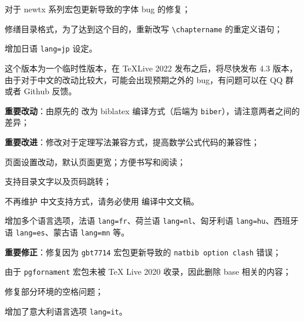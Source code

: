 \documentclass[lang=cn,newtx,10pt,scheme=chinese,pad,twocol]{zznote}
\begin{document}

\begin{change}
	\item 对于 newtx 系列宏包更新导致的字体 bug 的修复；
	\item 修缮目录格式，为了达到这个目的，重新改写 \lstinline{\chaptername} 的重定义语句；
	\item 增加日语 \lstinline{lang=jp} 设定。
	\item 这个版本为一个临时性版本，在 \TeX Live 2022 发布之后，将尽快发布 4.3 版本，由于对于中文的改动比较大，可能会出现预期之外的 bug，有问题可以在 QQ 群或者 Github 反馈。
\end{change}



\begin{change}
	\item \textbf{重要改动}：由原先的  改为 biblatex 编译方式（后端为 \lstinline{biber}），请注意两者之间的差异；
	\item \textbf{重要改进}：修改对于定理写法兼容方式，提高数学公式代码的兼容性；
	\item 页面设置改动，默认页面更宽；方便书写和阅读；
	\item 支持目录文字以及页码跳转；
	\item 不再维护  中文支持方式，请务必使用  编译中文文稿。
	\item 增加多个语言选项，法语 \lstinline{lang=fr}、荷兰语 \lstinline{lang=nl}、匈牙利语 \lstinline{lang=hu}、西班牙语 \lstinline{lang=es}、蒙古语 \lstinline{lang=mn} 等。
\end{change}



\begin{change}
	\item \textbf{重要修正}：修复因为 \lstinline{gbt7714} 宏包更新导致的 \lstinline{natbib option clash} 错误；
	\item 由于 \lstinline{pgfornament} 宏包未被 \TeX{} Live 2020 收录，因此删除 base 相关的内容；
	\item 修复部分环境的空格问题；
	\item 增加了意大利语言选项 \lstinline{lang=it}。
\end{change}


\end{document}
